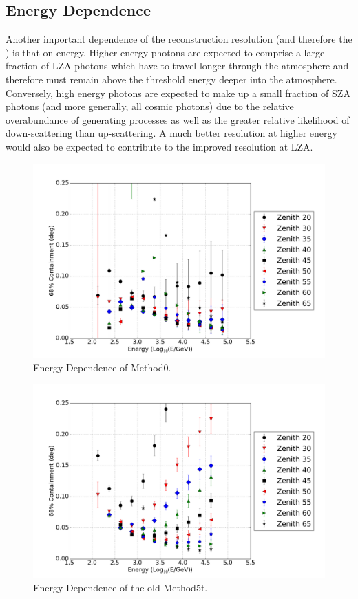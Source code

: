 \documentclass[main.tex]{subfiles}
\begin{document}
\subsection{Energy Dependence}
Another important dependence of the reconstruction resolution (and therefore the \rse\hspace{-4pt}) is that on energy. Higher energy photons are expected to comprise a large fraction of LZA photons which have to travel longer through the atmosphere and therefore must remain above the threshold energy deeper into the atmosphere. Conversely, high energy photons are expected to make up a small fraction of SZA photons (and more generally, all cosmic photons) due to the relative overabundance of generating processes as well as the greater relative likelihood of down-scattering than up-scattering. A much better resolution at higher energy would also be expected to contribute to the improved resolution at LZA.

\begin{figure}[htbp]
  \centering
  \includegraphics[width=.9\linewidth]{images/reg_energy}
  \caption{Energy Dependence of Method0.}
  \label{fig:energy_reg}
\end{figure}

\begin{figure}[htbp]
  \centering
  \includegraphics[width=.9\linewidth]{images/disp_standard_energy}
  \caption{Energy Dependence of the old Method5t.}
  \label{fig:energy_disp_standard}    
\end{figure}
\end{document}
